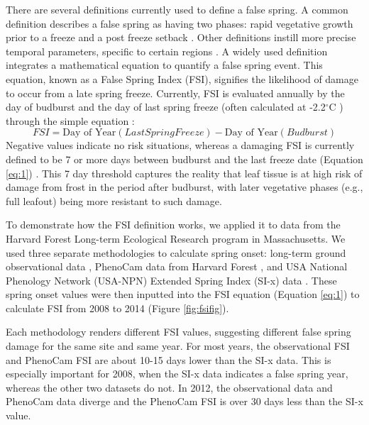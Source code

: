 \documentclass{article}\usepackage[]{graphicx}\usepackage[]{color}
\begin{document}
There are several definitions currently used to define a false spring. A common definition describes a false spring as having two phases: rapid vegetative growth prior to a freeze and a post freeze setback \citep{Gu2008}. Other definitions instill more precise temporal parameters, specific to certain regions \citep[e.g., in][false spring for the Midwestern United States is defined as a warmer than average March, a freezing April, and enough growing degree days between budburst and the last freeze date]{Augspurger2013}. A widely used definition integrates a mathematical equation to quantify a false spring event. This equation, known as a False Spring Index (FSI), signifies the likelihood of damage to occur from a late spring freeze. Currently, FSI is evaluated annually by the day of budburst and the day of last spring freeze (often calculated at -2.2$^{\circ}$C \citep{Schwartz1993}) through the simple equation \citep{Marino2011}:
\begin{equation} \label{eq:1}
FSI = \text{Day of Year} (Last Spring Freeze) - \text{Day of Year} (Budburst)
\end{equation}
Negative values indicate no risk situations, whereas a damaging FSI is currently defined to be 7 or more days between budburst and the last freeze date (Equation \ref{eq:1}) \citep{Peterson2014}. This 7 day threshold captures the reality that leaf tissue is at high risk of damage from frost in the period after budburst, with later vegetative phases (e.g., full leafout) being more resistant to such damage.%

To demonstrate how the FSI definition works, we applied it to data from the Harvard Forest Long-term Ecological Research program in Massachusetts. We used three separate methodologies to calculate spring onset: long-term ground observational data \citep{Okeefe2014}, PhenoCam data from Harvard Forest \citep{Richardson2015}, and USA National Phenology Network (USA-NPN) Extended Spring Index (SI-x) data \citep{USA-NPN2016}. These spring onset values were then inputted into the FSI equation (Equation \ref{eq:1}) to calculate FSI from 2008 to 2014 (Figure \ref{fig:fsifig}). 

Each methodology renders different FSI values, suggesting different false spring damage for the same site and same year. For most years, the observational FSI and PhenoCam FSI are about 10-15 days lower than the SI-x data. This is especially important for 2008, when the SI-x data indicates a false spring year, whereas the other two datasets do not. In 2012, the observational data and PhenoCam data diverge and the PhenoCam FSI is over 30 days less than the SI-x value.
\end{document}
